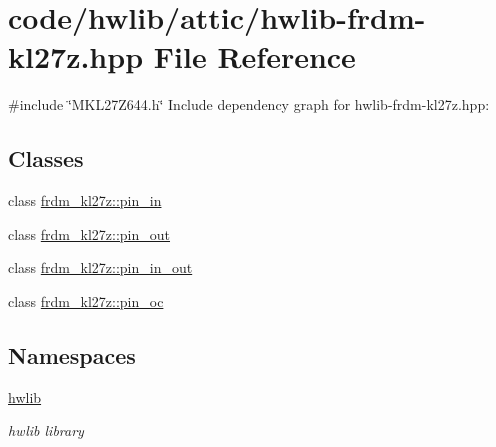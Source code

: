\hypertarget{hwlib-frdm-kl27z_8hpp}{}\section{code/hwlib/attic/hwlib-\/frdm-\/kl27z.hpp File Reference}
\label{hwlib-frdm-kl27z_8hpp}
{\ttfamily \#include \char`\"{}M\+K\+L27\+Z644.\+h\char`\"{}}\newline
Include dependency graph for hwlib-\/frdm-\/kl27z.hpp\+:
\subsection*{Classes}
\begin{DoxyCompactItemize}
\item 
class \hyperlink{classfrdm__kl27z_1_1pin__in}{frdm\+\_\+kl27z\+::pin\+\_\+in}
\item 
class \hyperlink{classfrdm__kl27z_1_1pin__out}{frdm\+\_\+kl27z\+::pin\+\_\+out}
\item 
class \hyperlink{classfrdm__kl27z_1_1pin__in__out}{frdm\+\_\+kl27z\+::pin\+\_\+in\+\_\+out}
\item 
class \hyperlink{classfrdm__kl27z_1_1pin__oc}{frdm\+\_\+kl27z\+::pin\+\_\+oc}
\end{DoxyCompactItemize}
\subsection*{Namespaces}
\begin{DoxyCompactItemize}
\item 
 \hyperlink{namespacehwlib}{hwlib}
\begin{DoxyCompactList}\small\item\em hwlib library \end{DoxyCompactList}\end{DoxyCompactItemize}
